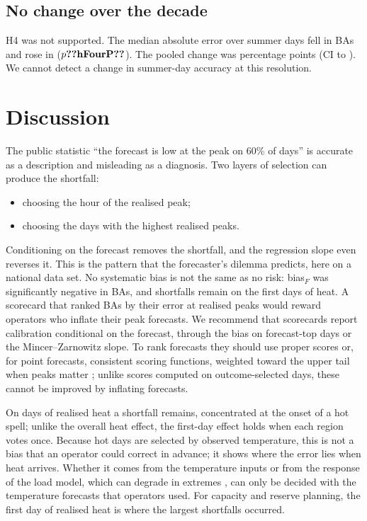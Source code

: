 \documentclass[conference,a4paper]{IEEEtran}
\begin{document}
\subsection{No change over the decade}
H4 was not supported. The median absolute error over summer days fell in  BAs and rose in  ($p\res{hFourP}$). The pooled change was  percentage points (CI  to ). We cannot detect a change in summer-day accuracy at this resolution.

\section{Discussion}

The public statistic ``the forecast is low at the peak on 60\% of days'' is accurate as a description and misleading as a diagnosis. Two layers of selection can produce the shortfall:
\begin{itemize}
\item choosing the hour of the realised peak;
\item choosing the days with the highest realised peaks.
\end{itemize}
Conditioning on the forecast removes the shortfall, and the regression slope even reverses it. This is the pattern that the forecaster's dilemma \cite{lerch2017dilemma} predicts, here on a national data set. No systematic bias is not the same as no risk: bias$_F$ was significantly negative in  BAs, and shortfalls remain on the first days of heat. A scorecard that ranked BAs by their error at realised peaks would reward operators who inflate their peak forecasts. We recommend that scorecards report calibration conditional on the forecast, through the bias on forecast-top days or the Mincer--Zarnowitz slope. To rank forecasts they should use proper scores or, for point forecasts, consistent scoring functions, weighted toward the upper tail when peaks matter \cite{gneiting2011comparing,taggart2021point}; unlike scores computed on outcome-selected days, these cannot be improved by inflating forecasts.

On days of realised heat a shortfall remains, concentrated at the onset of a hot spell; unlike the overall heat effect, the first-day effect holds when each region votes once. Because hot days are selected by observed temperature, this is not a bias that an operator could correct in advance; it shows where the error lies when heat arrives. Whether it comes from the temperature inputs \cite{sobhani2020temperature,douglas1998impacts} or from the response of the load model, which can degrade in extremes \cite{lu2026heat}, can only be decided with the temperature forecasts that operators used. For capacity and reserve planning, the first day of realised heat is where the largest shortfalls occurred.
\end{document}
